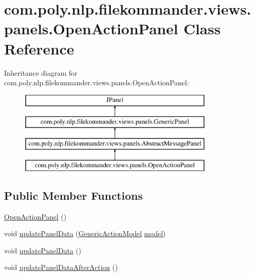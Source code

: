 \hypertarget{classcom_1_1poly_1_1nlp_1_1filekommander_1_1views_1_1panels_1_1_open_action_panel}{\section{com.\-poly.\-nlp.\-filekommander.\-views.\-panels.\-Open\-Action\-Panel Class Reference}
\label{classcom_1_1poly_1_1nlp_1_1filekommander_1_1views_1_1panels_1_1_open_action_panel}
}
Inheritance diagram for com.\-poly.\-nlp.\-filekommander.\-views.\-panels.\-Open\-Action\-Panel\-:\begin{figure}[H]
\begin{center}
\leavevmode
\includegraphics[height=4.000000cm]{classcom_1_1poly_1_1nlp_1_1filekommander_1_1views_1_1panels_1_1_open_action_panel}
\end{center}
\end{figure}
\subsection*{Public Member Functions}
\begin{DoxyCompactItemize}
\item 
\hyperlink{classcom_1_1poly_1_1nlp_1_1filekommander_1_1views_1_1panels_1_1_open_action_panel_aabcf90dcbfa737963540dfa801123e90}{Open\-Action\-Panel} ()
\item 
void \hyperlink{classcom_1_1poly_1_1nlp_1_1filekommander_1_1views_1_1panels_1_1_open_action_panel_aba56569929488006bc879522f8d65da8}{update\-Panel\-Data} (\hyperlink{interfacecom_1_1poly_1_1nlp_1_1filekommander_1_1views_1_1models_1_1_generic_action_model}{Generic\-Action\-Model} \hyperlink{classcom_1_1poly_1_1nlp_1_1filekommander_1_1views_1_1panels_1_1_open_action_panel_aba846378e4e1fd54f49642dcf88cb3d6}{model})
\item 
void \hyperlink{classcom_1_1poly_1_1nlp_1_1filekommander_1_1views_1_1panels_1_1_open_action_panel_a1e8521089a09fd734402e62d2352c275}{update\-Panel\-Data} ()
\item 
void \hyperlink{classcom_1_1poly_1_1nlp_1_1filekommander_1_1views_1_1panels_1_1_open_action_panel_aa37ab18925690ab2ed3ba3f1071126b2}{update\-Panel\-Data\-After\-Action} ()
\end{DoxyCompactItemize}

